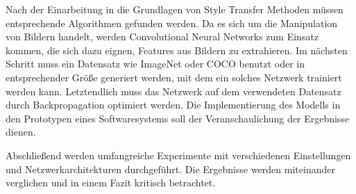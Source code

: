 Nach der Einarbeitung in die Grundlagen von Style Transfer \cite{DBLP:journals/corr/GatysEB15a, DBLP:journals/corr/JohnsonAL16} Methoden müssen entsprechende Algorithmen gefunden werden. Da es sich um die Manipulation von Bildern handelt, werden Convolutional Neural Networks \cite{lecun-gradientbased-learning-applied-1998} zum Einsatz kommen, die sich dazu eignen, Features aus Bildern zu extrahieren. Im nächsten Schritt muss ein Datensatz wie ImageNet \cite{5206848} oder COCO \cite{DBLP:journals/corr/LinMBHPRDZ14} benutzt oder in entsprechender Größe generiert werden, mit dem ein solches Netzwerk trainiert werden kann. Letztendlich muss das Netzwerk auf dem verwendeten Datensatz durch Backpropagation \cite{doi:10.1162/neco.1989.1.4.541} optimiert werden. Die Implementierung des Modells in den Prototypen eines Softwaresystems soll der Veranschaulichung der Ergebnisse dienen.

Abschließend werden umfangreiche Experimente mit verschiedenen Einstellungen und Netzwerkarchitekturen durchgeführt.
Die Ergebnisse werden miteinander verglichen und in einem Fazit kritisch betrachtet.